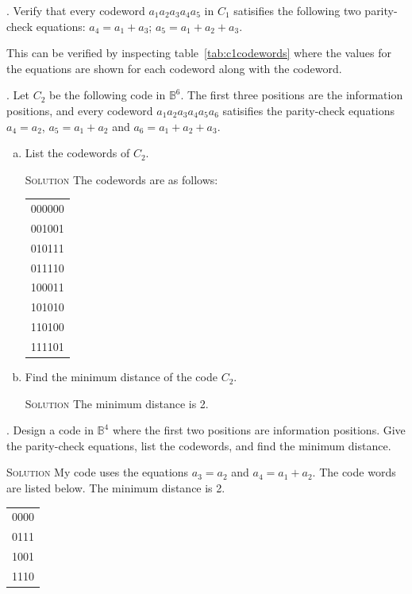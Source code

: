 \documentclass[twoside]{amsart}
\newcommand{\Solution}{\textsc{Solution}\xspace}
\begin{document}
\begin{enumerate}[A.]
      . Verify that every codeword $a_1 a_2 a_3 a_4 a_5$ in
      $C_1$ satisifies the following two parity-check equations:
      $a_4=a_1+a_3$; $a_5=a_1+a_2+a_3$. 

      This can be verified by inspecting table~\ref{tab:c1codewords} where
      the values for the equations are shown for each codeword along
      with the codeword.


      
      . Let $C_2$ be the following code in $\mathbb{B}^6$. The
      first three positions are the information positions, and every codeword 
      $a_1 a_2 a_3 a_4 a_5 a_6$ satisifies the parity-check equations
      $a_4 = a_2$, $a_5 = a_1 + a_2$ and $a_6 = a_1 + a_2 + a_3$.

      \begin{enumerate}[(a)]
         \item List the codewords of $C_2$.


	 \Solution The codewords are as follows:
	 \begin{table}[ht]
	    \begin{tabular}{l}
	       000000 \\
	       001001 \\
	       010111 \\
	       011110 \\
	       100011 \\
	       101010 \\
	       110100 \\
	       111101
	    \end{tabular}
	 \end{table}

         \item Find the minimum distance of the code $C_2$.

	 \noindent \Solution The minimum distance is 2.
      \end{enumerate}
      
      . Design a code in $\mathbb{B}^4$ where the first
      two positions are information positions. Give the parity-check
      equations, list the codewords, and find the minimum distance.

      \noindent \Solution My code uses the equations $a_3=a_2$ and
      $a_4 = a_1 + a_2$. The code words are listed below. The minimum
      distance is 2.
      \begin{table}[ht]
      \begin{tabular}{l}
        0000 \\
	0111 \\
	1001 \\
	1110
      \end{tabular}
      \end{table}


\end{enumerate}
\end{document}
